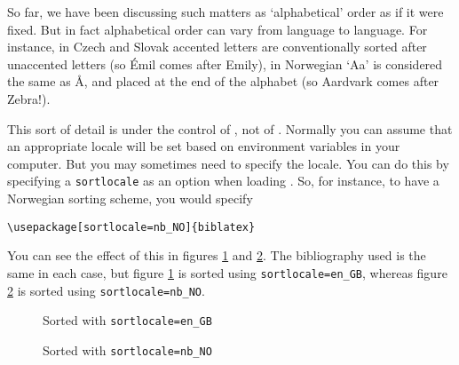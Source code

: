 So far, we have been discussing such matters as `alphabetical' order as if it were fixed. But in fact alphabetical order can vary from language to language. For instance, in Czech and Slovak accented letters are conventionally sorted after unaccented letters (so \'{E}mil comes after Emily), in Norwegian `Aa' is considered the same as \r{A}, and placed at the end of the alphabet (so Aardvark comes after Zebra!).

This sort of detail is under the control of , not of \biblatex. Normally you can assume that an appropriate locale will be set based on environment variables in your computer. But you may sometimes need to specify the locale. You can do this by specifying a \texttt{sortlocale} as an option when loading \biblatex. So, for instance, to have a Norwegian sorting scheme, you would specify
\begin{verbatim}
\usepackage[sortlocale=nb_NO]{biblatex}
\end{verbatim}

You can see the effect of this in figures \ref{zebra:en} and \ref{zebra:no}. The bibliography used is the same in each case, but figure \ref{zebra:en} is sorted using \texttt{sortlocale=en\_GB}, whereas figure \ref{zebra:no} is sorted using \texttt{sortlocale=nb\_NO}.

\begin{figure}
\caption{Sorted with \texttt{sortlocale=en\_GB}\label{zebra:en}}
\end{figure}

\begin{figure}
\caption{Sorted with \texttt{sortlocale=nb\_NO}\label{zebra:no}}
\end{figure}

